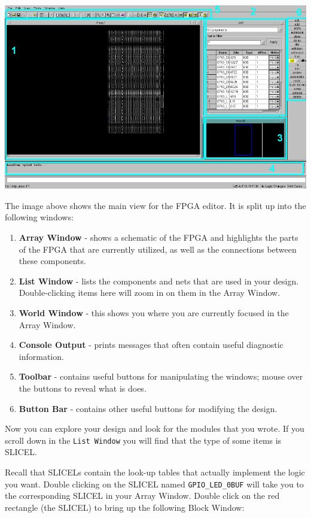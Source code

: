 \documentclass[11pt]{article}
\begin{document}
\begin{center}
	\includegraphics[width=\textwidth]{images/fpga_editor_1.png}
\end{center}

The image above shows the main view for the FPGA editor. It is split up into the following windows:

\begin{enumerate}
	\item \textbf{Array Window} - shows a schematic of the FPGA and highlights the parts of the FPGA that are currently utilized, as well as the connections between these components.
	\item \textbf{List Window} - lists the components and nets that are used in your design. Double-clicking items here will zoom in on them in the Array Window.
	\item \textbf{World Window} - this shows you where you are currently focused in the Array Window.
	\item \textbf{Console Output} - prints messages that often contain useful diagnostic information.
	\item \textbf{Toolbar} - contains useful buttons for manipulating the windows; mouse over the buttons to reveal what is does.
	\item \textbf{Button Bar} - contains other useful buttons for modifying the design.
\end{enumerate}

Now you can explore your design and look for the modules that you wrote. If you scroll down in the \verb|List Window| you will find that the type of some items is SLICEL.

Recall that SLICELs contain the look-up tables that actually implement the logic you want. Double clicking on the SLICEL named \verb|GPIO_LED_0BUF| will take you to the corresponding SLICEL in your Array Window. Double click on the red rectangle (the SLICEL) to bring up the following Block Window:
\end{document}
